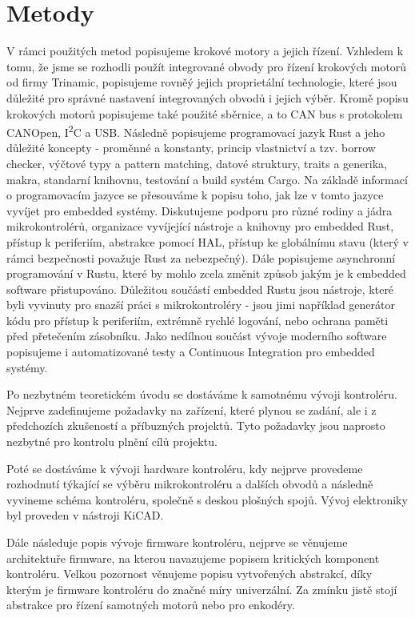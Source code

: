 \section*{Metody}
V rámci použitých metod popisujeme krokové motory a jejich řízení.
Vzhledem k tomu, že jsme se rozhodli použít integrované obvody pro řízení krokových motorů od firmy Trinamic, popisujeme rovněý jejich proprietální technologie, které jsou důležité pro správné nastavení integrovaných obvodů i jejich výběr.
Kromě popisu krokových motorů popisujeme také použité sběrnice, a to CAN bus s protokolem CANOpen, I\textsuperscript{2}C a USB.
Následně popisujeme programovací jazyk Rust a jeho důležité koncepty - proměnné a konstanty, princip vlastnictví a tzv. borrow checker, výčtové typy a pattern matching, datové struktury, traits a generika, makra, standarní knihovnu, testování a build systém Cargo.
Na základě informací o programovacím jazyce se přesouváme k popisu toho, jak lze v tomto jazyce vyvíjet pro embedded systémy.
Diskutujeme podporu pro různé rodiny a jádra mikrokontrolérů, organizace vyvíjející nástroje a knihovny pro embedded Rust, přístup k periferiím, abstrakce pomocí HAL, přístup ke globálnímu stavu (který v rámci bezpečnosti považuje Rust za nebezpečný).
Dále popisujeme asynchronní programování v Rustu, které by mohlo zcela změnit způsob jakým je k embedded software přistupováno.
Důležitou součástí embedded Rustu jsou nástroje, které byli vyvinuty pro snazší práci s mikrokontroléry - jsou jimi například generátor kódu pro přístup k periferiím, extrémně rychlé logování, nebo ochrana paměti před přetečením zásobníku.
Jako nedílnou součást vývoje moderního software popisujeme i automatizované testy a Continuous Integration pro embedded systémy.

Po nezbytném teoretickém úvodu se dostáváme k samotnému vývoji kontroléru.
Nejprve zadefinujeme požadavky na zařízení, které plynou se zadání, ale i z předchozích zkušeností a příbuzných projektů.
Tyto požadavky jsou naprosto nezbytné pro kontrolu plnění cílů projektu.

Poté se dostáváme k vývoji hardware kontroléru, kdy nejprve provedeme rozhodnutí týkající se výběru mikrokontroléru a dalších obvodů a následně vyvineme schéma kontroléru, společně s deskou plošných spojů.
Vývoj elektroniky byl proveden v nástroji KiCAD.

Dále následuje popis vývoje firmware kontroléru, nejprve se věnujeme architektuře firmware, na kterou navazujeme popisem kritických komponent kontroléru.
Velkou pozornost věnujeme popisu vytvořených abstrakcí, díky kterým je firmware kontroléru do značné míry univerzální.
Za zmínku jistě stojí abstrakce pro řízení samotných motorů nebo pro enkodéry.

